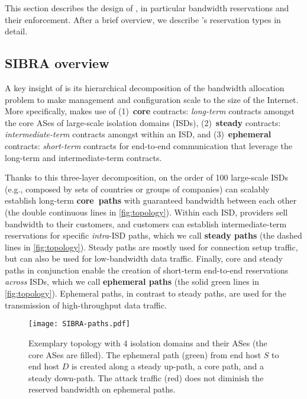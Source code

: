 \noindent This section describes the design of \name, in particular bandwidth
reservations and their enforcement. After a brief overview, we describe \name's
reservation types in detail.


\subsection{SIBRA overview}
\label{sec:overview}

\noindent A key insight of \name is its hierarchical decomposition of the
bandwidth allocation problem to make management and configuration scale to the
size of the Internet. More specifically, \name makes use of 
(1)~\textbf{core} contracts:
\emph{long-term} contracts amongst the core ASes of large-scale isolation domains (ISDs),
(2)~\textbf{steady} contracts:
\emph{intermediate-term} contracts amongst \ADs within an ISD, and
(3)~\textbf{ephemeral} contracts:
\emph{short-term} contracts for end-to-end communication that leverage the long-term
and inter\-mediate-term contracts.

Thanks to this three-layer decomposition, on the order of 100 large-scale ISDs (e.g.,
composed by sets of countries or groups of companies) can scalably establish
long-term \textbf{core~paths} with guaranteed bandwidth between each other (the
double continuous lines in \autoref{fig:topology}). Within each ISD, providers
sell bandwidth to their customers, and customers can establish
inter\-mediate-term reservations for specific \emph{intra}-ISD paths, which we
call \textbf{steady paths} (the dashed lines in \autoref{fig:topology}). Steady
paths are mostly used for connection setup traffic, but can also be used for
low-bandwidth data traffic.
Finally, core and steady paths in conjunction enable the creation of short-term
end-to-end reservations \emph{across} ISDs, which we call
\textbf{ephemeral paths} (the solid green lines in
\autoref{fig:topology}). Ephemeral paths, in contrast to steady paths,
are used for the transmission of high-throughput data traffic.

\begin{figure}[t]
  \begin{center}
    \texttt{[image: SIBRA-paths.pdf]}
  \end{center}
  \vspace{-5mm}
  \caption{Exemplary \name topology with 4 isolation domains and their ASes
  (the core ASes are filled). The ephemeral path (green) from end host $S$ to
  end host $D$ is created along a steady up-path, a core path, and a steady
  down-path. The attack traffic (red) does not diminish the reserved bandwidth
  on ephemeral paths.}
  \label{fig:topology}
  \vspace{-7mm}
\end{figure}

